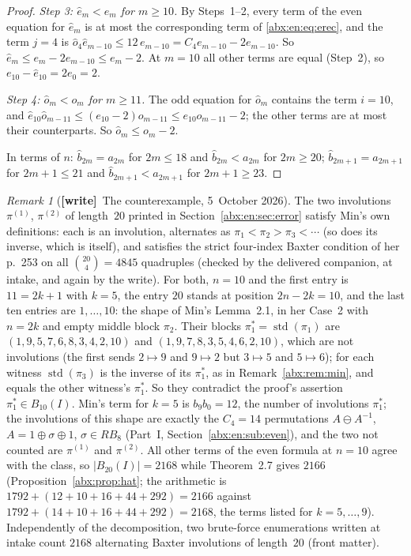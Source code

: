 \documentclass[11pt,letterpaper]{article}
\numberwithin{equation}{section}
\theoremstyle{remark}\newtheorem{remark}[theorem]{Remark}
\newcommand{\std}{\operatorname{std}}
\newcommand{\wtag}{\textup{\textbf{[write]}}}
\begin{document}
\begin{proof}
\emph{Step 3: $\hat e_m<e_m$ for $m\ge10$.} By Steps~1--2, every term of the even equation for $\hat e_m$ is at most the corresponding term of \eqref{abx:en:eq:erec}, and the term $j=4$ is $\hat o_4\hat e_{m-10}\le12\,e_{m-10}=C_4e_{m-10}-2e_{m-10}$. So $\hat e_m\le e_m-2e_{m-10}\le e_m-2$. At $m=10$ all other terms are equal (Step~2), so $e_{10}-\hat e_{10}=2e_0=2$.

\emph{Step 4: $\hat o_m<o_m$ for $m\ge11$.} The odd equation for $\hat o_m$ contains the term $i=10$, and $\hat e_{10}\hat o_{m-11}\le(e_{10}-2)o_{m-11}\le e_{10}o_{m-11}-2$; the other terms are at most their counterparts. So $\hat o_m\le o_m-2$.

In terms of $n$: $\hat b_{2m}=a_{2m}$ for $2m\le18$ and $\hat b_{2m}<a_{2m}$ for $2m\ge20$; $\hat b_{2m+1}=a_{2m+1}$ for $2m+1\le21$ and $\hat b_{2m+1}<a_{2m+1}$ for $2m+1\ge23$.
\end{proof}

\begin{remark}[\wtag\ The counterexample, 5~October 2026]\label{abx:rem:witness}
The two involutions $\pi^{(1)}$, $\pi^{(2)}$ of length~$20$ printed in Section~\ref{abx:en:sec:error} satisfy Min's own definitions: each is an involution, alternates as $\pi_1<\pi_2>\pi_3<\cdots$ (so does its inverse, which is itself), and satisfies the strict four-index Baxter condition of her p.~253 on all $\binom{20}{4}=4845$ quadruples (checked by the delivered companion, at intake, and again by the write). For both, $n=10$ and the first entry is $11=2k+1$ with $k=5$, the entry $20$ stands at position $2n-2k=10$, and the last ten entries are $1,\ldots,10$: the shape of Min's Lemma~2.1, in her Case~2 with $n=2k$ and empty middle block $\pi_2$. Their blocks $\pi_1^*=\std(\pi_1)$ are $(1,9,5,7,6,8,3,4,2,10)$ and $(1,9,7,8,3,5,4,6,2,10)$, which are not involutions (the first sends $2\mapsto9$ and $9\mapsto2$ but $3\mapsto5$ and $5\mapsto6$); for each witness $\std(\pi_3)$ is the inverse of its $\pi_1^*$, as in Remark~\ref{abx:rem:min}, and equals the other witness's $\pi_1^*$. So they contradict the proof's assertion $\pi_1^*\in B_{10}(I)$. Min's term for $k=5$ is $b_9b_0=12$, the number of involutions $\pi_1^*$; the involutions of this shape are exactly the $C_4=14$ permutations $A\ominus A^{-1}$, $A=1\oplus\sigma\oplus1$, $\sigma\in RB_8$ (Part~I, Section~\ref{abx:en:sub:even}), and the two not counted are $\pi^{(1)}$ and $\pi^{(2)}$. All other terms of the even formula at $n=10$ agree with the class, so $|B_{20}(I)|=2168$ while Theorem~2.7 gives $2166$ (Proposition~\ref{abx:prop:hat}; the arithmetic is $1792+(12+10+16+44+292)=2166$ against $1792+(14+10+16+44+292)=2168$, the terms listed for $k=5,\ldots,9$). Independently of the decomposition, two brute-force enumerations written at intake count $2168$ alternating Baxter involutions of length~$20$ (front matter).
\end{remark}
\end{document}
